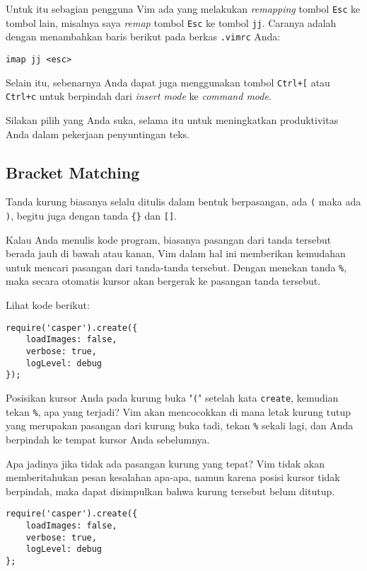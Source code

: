 \documentclass{article}
\begin{document}
Untuk itu sebagian pengguna Vim ada yang melakukan
\emph{remapping} tombol \verb=Esc= ke tombol lain, misalnya
saya \emph{remap} tombol \verb=Esc= ke tombol \verb=jj=.
Caranya adalah dengan menambahkan baris berikut pada berkas
\verb=.vimrc= Anda:

\begin{verbatim}
imap jj <esc>
\end{verbatim}

Selain itu, sebenarnya Anda dapat juga menggunakan tombol
\verb=Ctrl+[= atau \verb=Ctrl+c= untuk berpindah dari
    \emph{insert mode} ke \emph{command mode}.

Silakan pilih yang Anda suka, selama itu untuk meningkatkan
produktivitas Anda dalam pekerjaan penyuntingan teks.

\subsection{Bracket Matching}
Tanda kurung biasanya selalu ditulis dalam bentuk
berpasangan, ada \verb=(= maka ada \verb=)=, begitu juga
dengan tanda \verb={}= dan \verb=[]=.

Kalau Anda menulis kode program, biasanya pasangan dari
tanda tersebut berada jauh di bawah atau kanan, Vim dalam
hal ini memberikan kemudahan untuk mencari pasangan dari
tanda-tanda tersebut. Dengan menekan tanda \verb=%=, maka
secara otomatis kursor akan bergerak ke pasangan tanda
tersebut.

Lihat kode berikut:

\begin{verbatim}
require('casper').create({
    loadImages: false,
    verbose: true,
    logLevel: debug
});
\end{verbatim}

Posisikan kursor Anda pada kurung buka "\verb=(=" setelah kata
\verb=create=, kemudian tekan \verb=%=, apa yang terjadi?
Vim akan mencocokkan di mana letak kurung tutup yang
merupakan pasangan dari kurung buka tadi, tekan \verb=%=
sekali lagi, dan Anda berpindah ke tempat kursor Anda
sebelumnya.

Apa jadinya jika tidak ada pasangan kurung yang tepat? Vim
tidak akan memberitahukan pesan kesalahan apa-apa, namun
karena posisi kursor tidak berpindah, maka dapat disimpulkan
bahwa kurung tersebut belum ditutup.

\begin{verbatim}
require('casper').create({
    loadImages: false,
    verbose: true,
    logLevel: debug
};
\end{verbatim}
\end{document}
